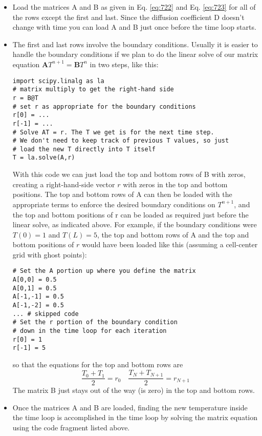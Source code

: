 \begin{itemize}
\item Load the matrices A and B as given in Eq. \ref{eq:722} and Eq. \ref{eq:723} for all of
the rows except the first and last. Since the diffusion coefficient D doesn\rq t
change with time you can load A and B just once before the time loop starts.
\item The first and last rows involve the boundary conditions. Usually it is easier
to handle the boundary conditions if we plan to do the linear solve of our matrix equation $\mathbf{A} T^{n+1}=\mathbf{B} T^{n}$ in two steps, like this:
\begin{lstlisting}
import scipy.linalg as la
# matrix multiply to get the right-hand side
r = B@T
# set r as appropriate for the boundary conditions
r[0] = ...
r[-1] = ...
# Solve AT = r. The T we get is for the next time step.
# We don't need to keep track of previous T values, so just
# load the new T directly into T itself
T = la.solve(A,r)
\end{lstlisting}
With this code we can just load the top and bottom rows of B with zeros, creating a right-hand-side vector $r$ with zeros in the top and bottom positions.
The top and bottom rows of A can then be loaded with the appropriate
terms to enforce the desired boundary conditions on $T^{n+1}$, and the top and
bottom positions of r can be loaded as required just before the linear solve,
as indicated above. For example, if the boundary conditions were $T (0) = 1$ and $T (L) = 5$, the top
and bottom rows of A and the top and bottom positions of $r$ would have
been loaded like this (assuming a cell-center grid with ghost points):
\begin{lstlisting}
# Set the A portion up where you define the matrix
A[0,0] = 0.5
A[0,1] = 0.5
A[-1,-1] = 0.5
A[-1,-2] = 0.5
... # skipped code
# Set the r portion of the boundary condition
# down in the time loop for each iteration
r[0] = 1
r[-1] = 5
\end{lstlisting}
so that the equations for the top and bottom rows are
\begin{equation}\label{eq:725}
\frac{T_{0}+T_{1}}{2}=r_{0} \quad \frac{T_{N}+T_{N+1}}{2}=r_{N+1}
\end{equation}
The matrix B just stays out of the way (is zero) in the top and bottom rows.
\item  Once the matrices A and B are loaded, finding the new temperature inside the time loop is accomplished in the time loop by solving the matrix
equation using the code fragment listed above.
\end{itemize}
